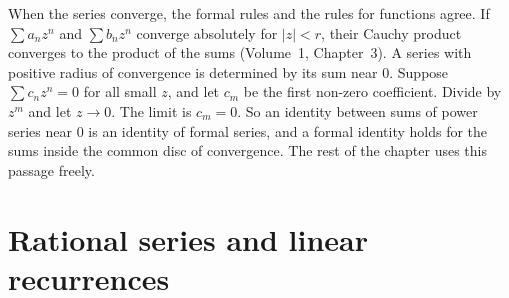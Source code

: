 \begin{remark}
When the series converge, the formal rules and the rules for functions agree. If $\sum a_nz^n$ and $\sum b_nz^n$ converge absolutely for $|z|<r$, their Cauchy product converges to the product of the sums (Volume~1, Chapter~3). A series with positive radius of convergence is determined by its sum near $0$. Suppose $\sum c_nz^n=0$ for all small $z$, and let $c_m$ be the first non-zero coefficient. Divide by $z^m$ and let $z\to0$. The limit is $c_m=0$. So an identity between sums of power series near $0$ is an identity of formal series, and a formal identity holds for the sums inside the common disc of convergence. The rest of the chapter uses this passage freely.
\end{remark}

\section{Rational series and linear recurrences}

